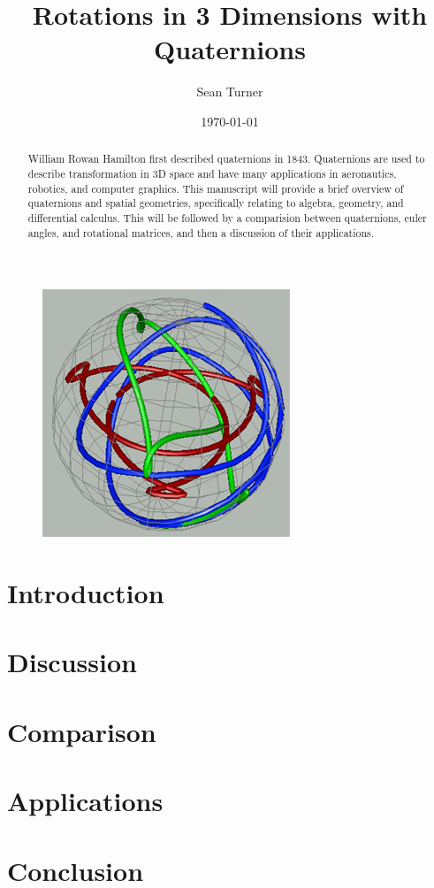\documentclass{article}
\theoremstyle{definition}
\begin{document}
\title{Rotations in 3 Dimensions with Quaternions}
\date{\today}
\author{Sean Turner}
\maketitle

\begin{figure}[H]
\centering
\includegraphics[width = .65\textwidth]{Figures/quaternion_map}
\end{figure}

\newpage
{}
\tableofcontents
\listoffigures
\newpage
{}
\begin{abstract}
\noindent William Rowan Hamilton first described quaternions in 1843.
Quaternions are used to describe transformation in 3D space and have many applications in aeronautics, robotics, and computer graphics.
This manuscript will provide a brief overview of quaternions and spatial geometries, specifically relating to algebra, geometry, and differential calculus.
This will be followed by a comparision between quaternions, euler angles, and rotational matrices, and then a discussion of their applications.
\end{abstract}

\section{Introduction}


\section{Discussion}
\label{sec:disc}


\section{Comparison}
\label{sec:comp}


\section{Applications}
\label{sec:app}


\section{Conclusion}
\label{sec:conc}


\newpage


\end{document}

